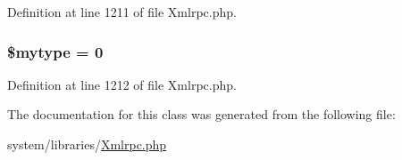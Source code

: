 Definition at line 1211 of file Xmlrpc.\-php.

\hypertarget{class_x_m_l___r_p_c___values_a49afa471d90298c2a53fb4dba2b099bf}{
\subsubsection[{\$mytype}]{\setlength{\rightskip}{0pt plus 5cm}\$mytype = 0}}\label{class_x_m_l___r_p_c___values_a49afa471d90298c2a53fb4dba2b099bf}


Definition at line 1212 of file Xmlrpc.\-php.



The documentation for this class was generated from the following file\-:\begin{DoxyCompactItemize}
\item 
system/libraries/\hyperlink{_xmlrpc_8php}{Xmlrpc.\-php}\end{DoxyCompactItemize}
